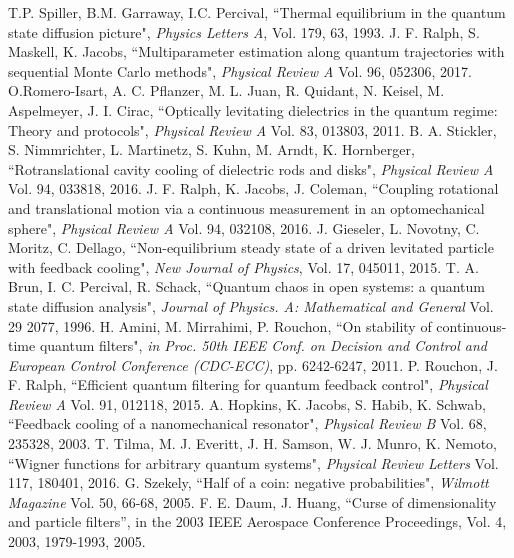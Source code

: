 \documentclass[conference]{IEEEtran}
\begin{document}
\begin{thebibliography}{1}
 T.P. Spiller, B.M. Garraway, I.C. Percival, ``Thermal equilibrium in the quantum state diffusion picture", {\em Physics Letters A}, Vol. 179, 63, 1993.
\newpage
 J. F. Ralph, S. Maskell, K. Jacobs, ``Multiparameter estimation along quantum trajectories with sequential Monte Carlo methods", {\em Physical Review A} Vol. 96, 052306, 2017.
 O.Romero-Isart, A. C. Pflanzer, M. L. Juan, R. Quidant, N. Keisel, M. Aspelmeyer, J. I. Cirac, ``Optically levitating dielectrics in the quantum regime: Theory and protocols", {\em Physical Review A} Vol. 83, 013803, 2011.
 B. A. Stickler, S. Nimmrichter, L. Martinetz, S. Kuhn, M. Arndt, K. Hornberger, ``Rotranslational cavity cooling of dielectric rods and disks", {\em Physical Review A} Vol. 94, 033818, 2016.
 J. F. Ralph, K. Jacobs, J. Coleman, ``Coupling rotational and translational motion via a continuous measurement in an optomechanical sphere", {\em Physical Review A} Vol. 94, 032108, 2016.
 J. Gieseler, L. Novotny, C. Moritz, C. Dellago, ``Non-equilibrium steady state of a driven levitated particle with feedback cooling", {\em New Journal of Physics}, Vol. 17, 045011, 2015.
 T. A. Brun, I. C. Percival, R. Schack, ``Quantum chaos in open systems: a quantum state diffusion analysis", {\em Journal of Physics. A: Mathematical and General} Vol. 29 2077, 1996.
 H. Amini, M. Mirrahimi, P. Rouchon, ``On stability of continuous-time quantum filters", {\em in Proc. 50th IEEE Conf. on Decision and Control and
European Control Conference (CDC-ECC)},  pp. 6242-6247, 2011.
 P. Rouchon, J. F. Ralph, ``Efficient quantum filtering for quantum feedback control", {\em Physical Review A} Vol. 91, 012118, 2015.
 A. Hopkins, K. Jacobs, S. Habib, K. Schwab, ``Feedback cooling of a nanomechanical resonator", {\em Physical Review B} Vol. 68, 235328, 2003.
 T. Tilma, M. J. Everitt, J. H. Samson, W. J. Munro, K. Nemoto, ``Wigner functions for arbitrary quantum systems", {\em Physical Review Letters} Vol. 117, 180401, 2016.
 G. Szekely, ``Half of a coin: negative probabilities", {\em Wilmott Magazine} Vol. 50, 66-68, 2005. 
 F. E. Daum, J. Huang, ``Curse of dimensionality and particle filters'', in the 2003 IEEE Aerospace Conference Proceedings, Vol. 4, 2003, 1979-1993, 2005. 

\end{thebibliography}
\end{document}
